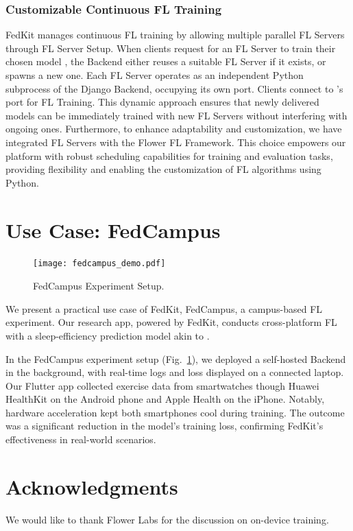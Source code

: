 \documentclass[letterpaper]{article} %
\begin{document}
\subsubsection{Customizable Continuous FL Training}
FedKit manages continuous FL training by allowing multiple parallel FL Servers
through FL Server Setup.
When clients request for an FL Server to
train their chosen model \model{},
the Backend either reuses a suitable FL Server \fs{} if it exists,
or spawns a new one.
Each FL Server
operates as an independent Python subprocess of the Django Backend,
occupying its own port.
Clients connect to \fs{}'s port for FL Training.
This dynamic approach ensures that
newly delivered models can be immediately trained with new FL Servers
without interfering with ongoing ones.
Furthermore, to enhance adaptability and customization, we have integrated FL Servers with the Flower FL Framework. This choice empowers our platform with robust scheduling capabilities for training and evaluation tasks, providing flexibility and enabling the customization of FL algorithms using Python.


\section{Use Case: FedCampus}

\begin{figure}
    \centering
    \texttt{[image: fedcampus\_demo.pdf]}
    \caption{FedCampus Experiment Setup.}
    \label{fig:fedcampus}
\end{figure}

We present a practical use case of FedKit, FedCampus,
a campus-based FL experiment.
Our research app, powered by FedKit,
conducts cross-platform FL with a sleep-efficiency prediction model
akin to \cite{khoa2022fedmcrnn}.

In the FedCampus experiment setup (Fig.~\ref{fig:fedcampus}),
we deployed a self-hosted Backend in the background,
with real-time logs and loss displayed on a connected laptop.
Our Flutter app collected exercise data from smartwatches
though Huawei HealthKit on the Android phone and Apple Health on the iPhone.
Notably, hardware acceleration kept both smartphones cool during training.
The outcome was a significant reduction in the model's training loss,
confirming FedKit's effectiveness in real-world scenarios.

\appendix

\section*{Acknowledgments}
We would like to thank Flower Labs for the discussion on on-device training.

\bigskip


\end{document}

